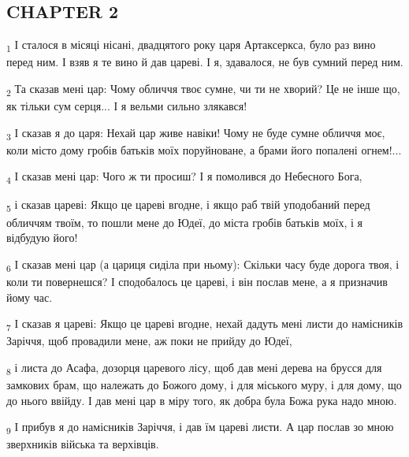 \subsection{CHAPTER 2}
\begin{tcolorbox}
\textsubscript{1} І сталося в місяці нісані, двадцятого року царя Артаксеркса, було раз вино перед ним. І взяв я те вино й дав цареві. І я, здавалося, не був сумний перед ним.
\end{tcolorbox}
\begin{tcolorbox}
\textsubscript{2} Та сказав мені цар: Чому обличчя твоє сумне, чи ти не хворий? Це не інше що, як тільки сум серця... І я вельми сильно злякався!
\end{tcolorbox}
\begin{tcolorbox}
\textsubscript{3} І сказав я до царя: Нехай цар живе навіки! Чому не буде сумне обличчя моє, коли місто дому гробів батьків моїх поруйноване, а брами його попалені огнем!...
\end{tcolorbox}
\begin{tcolorbox}
\textsubscript{4} І сказав мені цар: Чого ж ти просиш? І я помолився до Небесного Бога,
\end{tcolorbox}
\begin{tcolorbox}
\textsubscript{5} і сказав цареві: Якщо це цареві вгодне, і якщо раб твій уподобаний перед обличчям твоїм, то пошли мене до Юдеї, до міста гробів батьків моїх, і я відбудую його!
\end{tcolorbox}
\begin{tcolorbox}
\textsubscript{6} І сказав мені цар (а цариця сиділа при ньому): Скільки часу буде дорога твоя, і коли ти повернешся? І сподобалось це цареві, і він послав мене, а я призначив йому час.
\end{tcolorbox}
\begin{tcolorbox}
\textsubscript{7} І сказав я цареві: Якщо це цареві вгодне, нехай дадуть мені листи до намісників Заріччя, щоб провадили мене, аж поки не прийду до Юдеї,
\end{tcolorbox}
\begin{tcolorbox}
\textsubscript{8} і листа до Асафа, дозорця царевого лісу, щоб дав мені дерева на брусся для замкових брам, що належать до Божого дому, і для міського муру, і для дому, що до нього ввійду. І дав мені цар в міру того, як добра була Божа рука надо мною.
\end{tcolorbox}
\begin{tcolorbox}
\textsubscript{9} І прибув я до намісників Заріччя, і дав їм цареві листи. А цар послав зо мною зверхників війська та верхівців.
\end{tcolorbox}

